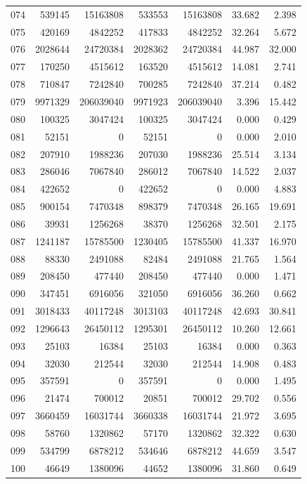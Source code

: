 \begin{longtable}{lrrrrrr}
074 & 539145 & 15163808 & 533553 & 15163808 & 33.682 & 2.398\\
075 & 420169 & 4842252 & 417833 & 4842252 & 32.264 & 5.672\\
076 & 2028644 & 24720384 & 2028362 & 24720384 & 44.987 & 32.000\\
077 & 170250 & 4515612 & 163520 & 4515612 & 14.081 & 2.741\\
078 & 710847 & 7242840 & 700285 & 7242840 & 37.214 & 0.482\\
079 & 9971329 & 206039040 & 9971923 & 206039040 & 3.396 & 15.442\\
080 & 100325 & 3047424 & 100325 & 3047424 & 0.000 & 0.429\\
081 & 52151 & 0 & 52151 & 0 & 0.000 & 2.010\\
082 & 207910 & 1988236 & 207030 & 1988236 & 25.514 & 3.134\\
083 & 286046 & 7067840 & 286012 & 7067840 & 14.522 & 2.037\\
084 & 422652 & 0 & 422652 & 0 & 0.000 & 4.883\\
085 & 900154 & 7470348 & 898379 & 7470348 & 26.165 & 19.691\\
086 & 39931 & 1256268 & 38370 & 1256268 & 32.501 & 2.175\\
087 & 1241187 & 15785500 & 1230405 & 15785500 & 41.337 & 16.970\\
088 & 88330 & 2491088 & 82484 & 2491088 & 21.765 & 1.564\\
089 & 208450 & 477440 & 208450 & 477440 & 0.000 & 1.471\\
090 & 347451 & 6916056 & 321050 & 6916056 & 36.260 & 0.662\\
091 & 3018433 & 40117248 & 3013103 & 40117248 & 42.693 & 30.841\\
092 & 1296643 & 26450112 & 1295301 & 26450112 & 10.260 & 12.661\\
093 & 25103 & 16384 & 25103 & 16384 & 0.000 & 0.363\\
094 & 32030 & 212544 & 32030 & 212544 & 14.908 & 0.483\\
095 & 357591 & 0 & 357591 & 0 & 0.000 & 1.495\\
096 & 21474 & 700012 & 20851 & 700012 & 29.702 & 0.556\\
097 & 3660459 & 16031744 & 3660338 & 16031744 & 21.972 & 3.695\\
098 & 58760 & 1320862 & 57170 & 1320862 & 32.322 & 0.630\\
099 & 534799 & 6878212 & 534646 & 6878212 & 44.659 & 3.547\\
100 & 46649 & 1380096 & 44652 & 1380096 & 31.860 & 0.649\\
\end{longtable}

